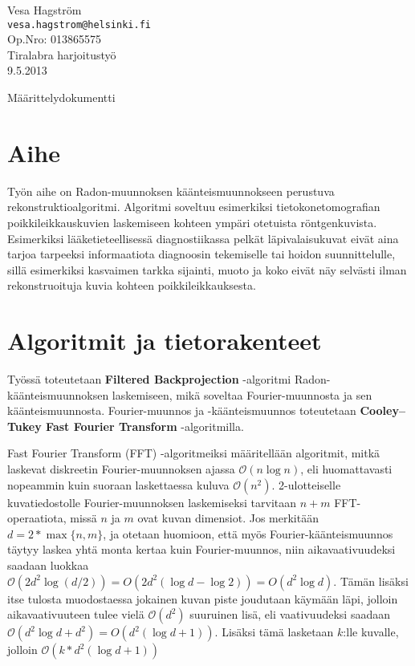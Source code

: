 \documentclass[12pt,a4paper]{report}
\author{Vesa Hagström}
\begin{document}
    \renewcommand{\bibname}{Viitteet}

	\begin{titlepage}
    \label{Title}
	\begin{flushleft}
		\hfill Vesa Hagström 											\\
		\hfill \texttt{vesa.hagstrom@helsinki.fi} 						\\
		\hfill Op.Nro: 013865575											\\
		\hfill Tiralabra harjoitustyö									\\
		\hfill 9.5.2013													\\
	\end{flushleft}

	\vfill

	\begin{center}
		\huge{Määrittelydokumentti}
	\end{center}

	\vfill

	\end{titlepage}

    \section*{Aihe}
    \label{Aihe}
    Työn aihe on Radon-muunnoksen käänteismuunnokseen perustuva rekonstruktioalgoritmi. Algoritmi soveltuu esimerkiksi tietokonetomografian poikkileikkauskuvien laskemiseen  kohteen ympäri otetuista röntgenkuvista. Esimerkiksi lääketieteellisessä diagnostiikassa pelkät läpivalaisukuvat eivät aina tarjoa tarpeeksi informaatiota diagnoosin tekemiselle tai hoidon suunnittelulle, sillä esimerkiksi kasvaimen tarkka sijainti, muoto ja koko eivät näy selvästi ilman rekonstruoituja kuvia kohteen poikkileikkauksesta.
    
    \section*{Algoritmit ja tietorakenteet}
    Työssä toteutetaan \textbf{Filtered Backprojection} -algoritmi Radon-käänteismuunnoksen laskemiseen, mikä soveltaa Fourier-muunnosta ja sen käänteismuunnosta. Fourier-muunnos ja -käänteismuunnos toteutetaan \textbf{Cooley–Tukey Fast Fourier Transform}  -algoritmilla.
    
    Fast Fourier Transform (FFT) -algoritmeiksi määritellään algoritmit, mitkä laskevat diskreetin Fourier-muunnoksen ajassa $\mathcal O(n \log n)$, eli huomattavasti nopeammin kuin suoraan laskettaessa kuluva $\mathcal O(n^2)$. 2-ulotteiselle kuvatiedostolle Fourier-muunnoksen laskemiseksi tarvitaan $n+m$ FFT-operaatiota, missä $n$ ja $m$ ovat kuvan dimensiot. Jos merkitään $d = 2 * \max \lbrace n, m \rbrace$, ja otetaan huomioon, että myös Fourier-käänteismuunnos täytyy laskea yhtä monta kertaa kuin Fourier-muunnos, niin aikavaativuudeksi saadaan luokkaa $\mathcal O(2d^2\log (d/2)) = O(2d^2 (\log d - \log 2) ) = O(d^2 \log d)$. Tämän lisäksi itse tulosta muodostaessa jokainen kuvan piste joudutaan käymään läpi, jolloin aikavaativuuteen tulee vielä $\mathcal O(d^2)$ suuruinen lisä, eli vaativuudeksi saadaan $\mathcal O(d^2 \log d + d^2) = O(d^2 (\log d + 1))$. Lisäksi tämä lasketaan $k$:lle kuvalle, jolloin $\mathcal O(k*d^2 (\log d + 1))$
    
\end{document}
